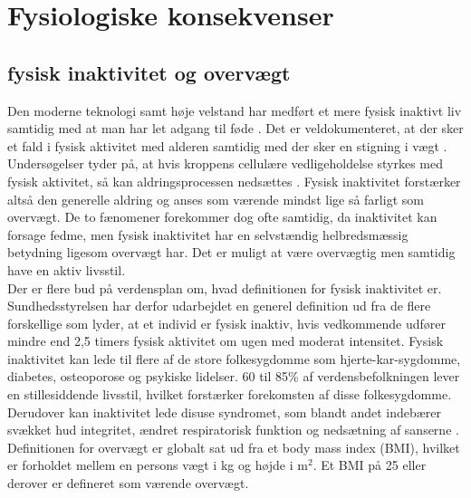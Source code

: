 \section{Fysiologiske konsekvenser}


\subsection{fysisk inaktivitet og overvægt}
Den moderne teknologi samt høje velstand har medført et mere fysisk inaktivt liv samtidig med at man har let adgang til føde \cite{Kiens2007}. Det er veldokumenteret, at der sker et fald i fysisk aktivitet med alderen samtidig med der sker en stigning i vægt \cite{Kaprio2008}. Undersøgelser tyder på, at hvis kroppens cellulære vedligeholdelse styrkes med fysisk aktivitet, så kan aldringsprocessen nedsættes \cite{Knight2012}. Fysisk inaktivitet forstærker altså den generelle aldring og anses som værende mindst lige så farligt som overvægt. De to fænomener forekommer dog ofte samtidig, da inaktivitet kan forsage fedme, men fysisk inaktivitet har en selvstændig helbredsmæssig betydning ligesom overvægt har. Det er muligt at være overvægtig men samtidig have en aktiv livsstil. \cite{Kiens2007,Kaprio2008,Hjort1997}\\
Der er flere bud på verdensplan om, hvad definitionen for fysisk inaktivitet er. Sundhedsstyrelsen har derfor udarbejdet en generel definition ud fra de flere forskellige som lyder, at et individ er fysisk inaktiv, hvis vedkommende udfører mindre end 2,5 timers fysisk aktivitet om ugen med moderat intensitet. \cite{kiens2007} Fysisk inaktivitet kan lede til flere af de store folkesygdomme som hjerte-kar-sygdomme, diabetes, osteoporose og psykiske lidelser. 60 til 85\% af verdensbefolkningen lever en stillesiddende livsstil, hvilket forstærker forekomsten af disse folkesygdomme. \cite{kiens2007,Reshma2002april} Derudover kan inaktivitet lede disuse syndromet, som blandt andet indebærer svækket hud integritet, ændret respiratorisk funktion og nedsætning af sanserne \cite{Knight2012,Mosby2009}.\\
Definitionen for overvægt er globalt sat ud fra et body mass index (BMI), hvilket er forholdet mellem en persons vægt i kg og højde i m$^2$. Et BMI på 25 eller derover er defineret som værende overvægt. \cite{Academic2016}


